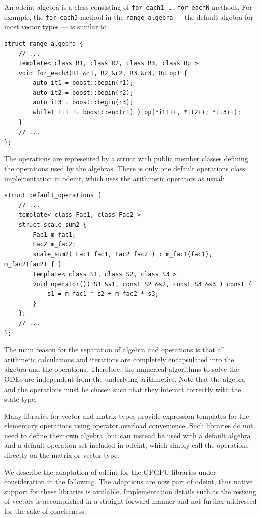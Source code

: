 \documentclass[final]{siamltex}
\newcommand{\code}[1]{\lstinline|#1|}
\begin{document}
An odeint algebra is a class consisting of
\code{for_each1}, \dots, \code{for_eachN} methods. For example, the
\code{for_each3} method in the \code{range_algebra} --- the default algebra for
most vector types --- is similar to
\begin{lstlisting}
struct range_algebra {
    // ...
    template< class R1, class R2, class R3, class Op >
    void for_each3(R1 &r1, R2 &r2, R3 &r3, Op op) {
        auto it1 = boost::begin(r1);
        auto it2 = boost::begin(r2);
        auto it3 = boost::begin(r3);
        while( it1 != boost::end(r1) ) op(*it1++, *it2++; *it3++);
    }
    // ...
};
\end{lstlisting}
The operations are represented by a struct with public member classes defining the
operations used by the algebras. There is only one default
operations class implementation in odeint, which uses the arithmetic operators as usual:
\begin{lstlisting}
struct default_operations {
    // ...
    template< class Fac1, class Fac2 >
    struct scale_sum2 {
        Fac1 m_fac1;
        Fac2 m_fac2;
        scale_sum2( Fac1 fac1, Fac2 fac2 ) : m_fac1(fac1), m_fac2(fac2) { }
        template< class S1, class S2, class S3 >
        void operator()( S1 &s1, const S2 &s2, const S3 &s3 ) const {
            s1 = m_fac1 * s2 + m_fac2 * s3;
        }
    };
    // ...
};
\end{lstlisting}

The main reason for the separation of algebra and operations is that
all arithmetic calculations and iterations are completely encapsulated
into the algebra and the operations. Therefore, the numerical
algorithms to solve the ODEs are independent from the underlying
arithmetics. Note that the algebra and the operations must be chosen
such that they interact correctly with the state type.

Many libraries for vector and matrix types provide expression templates
\cite{Vandevoorde:CppTemplates,Veldhuizen:ExpressionTemplates, Veldhuizen:Techniques}
for the elementary operations using operator overload
convenience.  Such libraries do not need to define their own algebra, but can
instead be used with a default algebra and a default operation set included in
odeint, which simply call the operations directly on the matrix or vector type.

We describe the adaptation of odeint for the GPGPU libraries under
consideration in the following. The adaptions are now part of odeint, thus
native support for these libraries is available.  Implementation details such as
the resizing of vectors is accomplished in a straight-forward manner and not
further addressed for the sake of conciseness.
\end{document}
